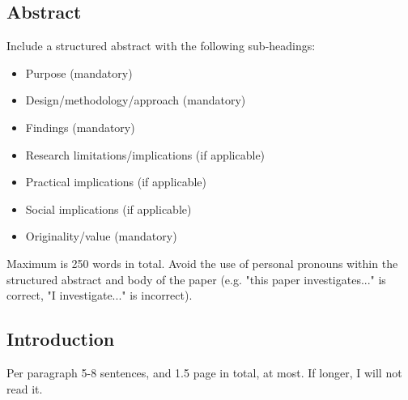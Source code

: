 \documentclass{article}
\begin{document}
\subsection{Abstract}

Include a structured abstract with the following sub-headings:
\begin{itemize}
\item Purpose (mandatory) 
\item Design/methodology/approach (mandatory)
\item  Findings (mandatory) 
\item Research limitations/implications (if applicable)
\item Practical implications (if applicable) 
\item Social implications (if applicable)
\item Originality/value (mandatory) 
\end{itemize}
Maximum is 250 words in total.  Avoid the use of personal pronouns
within the structured abstract and body of the paper (e.g. "this paper
investigates..." is correct, "I investigate..." is incorrect).


\subsection{Introduction}
\label{sec:introduction}

Per paragraph 5-8 sentences, and 1.5 page in total, at most.  If longer, I will not read it. 
\end{document}
